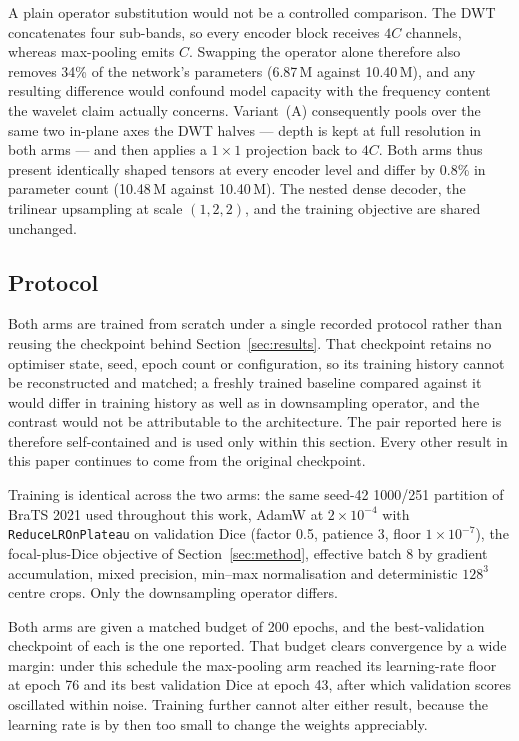 \documentclass[conference]{IEEEtran}
\begin{document}
A plain operator substitution would not be a controlled comparison. The DWT concatenates four sub-bands, so every encoder block receives $4C$ channels, whereas max-pooling emits $C$. Swapping the operator alone therefore also removes 34\% of the network's parameters (6.87\,M against 10.40\,M), and any resulting difference would confound model capacity with the frequency content the wavelet claim actually concerns. Variant~(A) consequently pools over the same two in-plane axes the DWT halves --- depth is kept at full resolution in both arms --- and then applies a $1\times1$ projection back to $4C$. Both arms thus present identically shaped tensors at every encoder level and differ by 0.8\% in parameter count (10.48\,M against 10.40\,M). The nested dense decoder, the trilinear upsampling at scale $(1,2,2)$, and the training objective are shared unchanged.

\subsection{Protocol}

Both arms are trained from scratch under a single recorded protocol rather than reusing the checkpoint behind Section~\ref{sec:results}. That checkpoint retains no optimiser state, seed, epoch count or configuration, so its training history cannot be reconstructed and matched; a freshly trained baseline compared against it would differ in training history as well as in downsampling operator, and the contrast would not be attributable to the architecture. The pair reported here is therefore self-contained and is used only within this section. Every other result in this paper continues to come from the original checkpoint.

Training is identical across the two arms: the same seed-42 1000/251 partition of BraTS 2021 used throughout this work, AdamW at $2\times10^{-4}$ with \texttt{ReduceLROnPlateau} on validation Dice (factor 0.5, patience 3, floor $1\times10^{-7}$), the focal-plus-Dice objective of Section~\ref{sec:method}, effective batch 8 by gradient accumulation, mixed precision, min--max normalisation and deterministic $128^3$ centre crops. Only the downsampling operator differs.

Both arms are given a matched budget of 200 epochs, and the best-validation checkpoint of each is the one reported. That budget clears convergence by a wide margin: under this schedule the max-pooling arm reached its learning-rate floor at epoch 76 and its best validation Dice at epoch 43, after which validation scores oscillated within noise. Training further cannot alter either result, because the learning rate is by then too small to change the weights appreciably.
\end{document}
